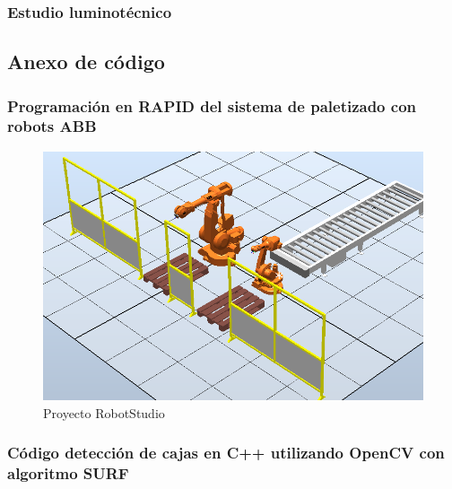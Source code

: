 \pagebreak

\subsubsection{Estudio luminotécnico}
\label{sec:Estudio luminotecnico}











\newpage
\subsection{Anexo de código}
\label{sec:codigo}

\pagebreak

\subsubsection{Programación en RAPID del sistema de paletizado con robots ABB}

\begin{figure}[!htb]
\centering
\includegraphics[width=1\textwidth]{Datasheets/robotstudio.png}
\caption{Proyecto RobotStudio}
\label{fig:digraph}
\end{figure}



\pagebreak

\subsubsection{Código detección de cajas en C++ utilizando OpenCV con algoritmo SURF}

\newpage










